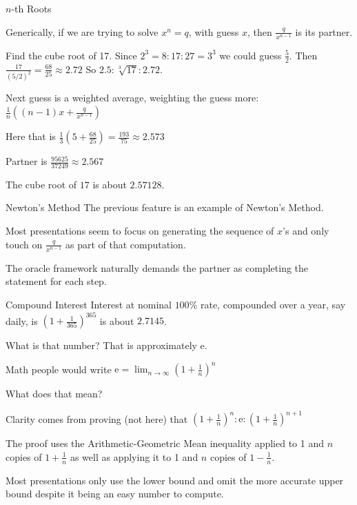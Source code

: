 \documentclass{beamer}
\begin{document}
\begin{frame}{$n$-th Roots}

    Generically,  if we are trying to solve $x^n = q$, with guess $x$, then $\frac{q}{x^{n-1}}$ is its partner. 

    Find the cube root of 17. Since $2^3 = 8 : 17 : 27=3^3$ we could guess $\frac{5}{2}$. Then $\frac{17}{ (5/2)^2 }  = \frac{68}{25} \approx 2.72$  So $2.5:\sqrt[3]{17}:2.72$.

    Next guess is a weighted average, weighting the guess more: $\frac{1}{n} ((n-1) x + \frac{q}{x^{n-1}})$

    Here that is $\frac{1}{3} ( 5 + \frac{68}{25}) = \frac{193}{75} \approx 2.573$

    Partner is $\frac{95625}{37249} \approx 2.567$

    The cube root of $17$ is about $2.57128$. 
\end{frame}

\begin{frame}{Newton's Method}
    The previous feature is an example of Newton's Method. 

    Most presentations seem to focus on generating the sequence of $x$'s and only touch on $\frac{q}{x^{n-1}}$ as part of that computation. 

    The oracle framework naturally demands the partner as completing the statement for each step. 

    
\end{frame}


\begin{frame}{Compound Interest}
    Interest at nominal $100\%$ rate, compounded over a year, say daily, is $(1+\frac{1}{365})^{365}$ is about $2.7145$.

    What is that number?  That is approximately $\mathrm{e}$. 

    Math people would write $\mathrm{e} = \lim_{n \to \infty} (1+\frac{1}{n})^n$

    What does that mean? 

    Clarity comes from proving (not here) that $(1+\frac{1}{n})^n : \mathrm{e} : (1+\frac{1}{n})^{n+1}$

    The proof uses the Arithmetic-Geometric Mean inequality applied to 1 and $n$ copies of $1 + \frac{1}{n}$ as well as applying it to 1 and $n$ copies of $1 - \frac{1}{n}$.
 
    Most presentations only use the lower bound and omit the more accurate upper bound despite it being an easy number to compute. 
    
\end{frame}
\end{document}
